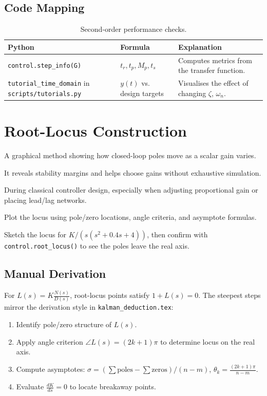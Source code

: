 \subsection{Code Mapping}
\begin{table}[h]
    \centering
    \small
    \renewcommand{\arraystretch}{1.2}
    \begin{tabularx}{\linewidth}{|>{\raggedright\arraybackslash}p{4cm}|X|X|}
        \hline
        \textbf{Python} & \textbf{Formula} & \textbf{Explanation} \\
        \hline
        \texttt{control.step\_info(G)} & $t_r, t_p, M_p, t_s$ & Computes metrics from the transfer function. \\
        \hline
        \texttt{tutorial\_time\_domain} in \texttt{scripts/tutorials.py} & $y(t)$ vs. design targets & Visualises the effect of changing $\zeta$, $\omega_n$. \\
        \hline
    \end{tabularx}
    \caption{Second-order performance checks.}
\end{table}

\section{Root-Locus Construction}
\begin{beginnerguide}
    \item[\textbf{What?}] A graphical method showing how closed-loop poles move as a scalar gain varies.
    \item[\textbf{Why?}] It reveals stability margins and helps choose gains without exhaustive simulation.
    \item[\textbf{When?}] During classical controller design, especially when adjusting proportional gain or placing lead/lag networks.
    \item[\textbf{How?}] Plot the locus using pole/zero locations, angle criteria, and asymptote formulas.
    \item[\textbf{Example}] Sketch the locus for $K/(s(s^2+0.4s+4))$, then confirm with \texttt{control.root\_locus()} to see the poles leave the real axis.
\end{beginnerguide}
\subsection{Manual Derivation}
For $L(s) = K \frac{N(s)}{D(s)}$, root-locus points satisfy $1 + L(s) = 0$. The steepest steps mirror the derivation style in \texttt{kalman\_deduction.tex}:
\begin{enumerate}[leftmargin=*]
    \item Identify pole/zero structure of $L(s)$.
    \item Apply angle criterion $\angle L(s) = (2k+1)\pi$ to determine locus on the real axis.
    \item Compute asymptotes: $\sigma = (\sum \text{poles} - \sum \text{zeros})/(n - m)$, $\theta_k = \frac{(2k+1)\pi}{n-m}$.
    \item Evaluate $\frac{dK}{ds} = 0$ to locate breakaway points.
\end{enumerate}

